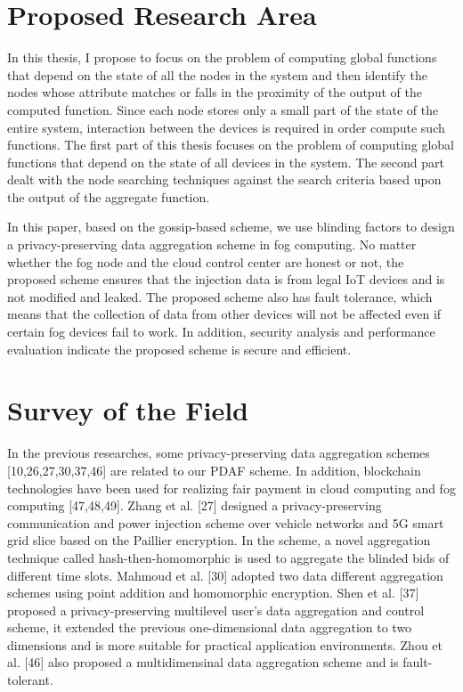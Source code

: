 \documentclass[10pt]{llncs}
\begin{document}
\section{Proposed Research Area}
%
In this thesis, I propose to focus on the problem of computing global functions that depend on the state of all the nodes in the system and then identify the nodes whose attribute matches or falls in the proximity of the output of the computed function. Since each node stores only a small part of the state of the entire system, interaction between the devices is required in order compute such functions. The first part of this thesis focuses on the problem of computing global functions that depend on the state of all devices in the system. The second part dealt with the node searching techniques against the search criteria based upon the output of the aggregate function.


In this paper, based on the gossip-based scheme, we use blinding factors to design a privacy-preserving data aggregation scheme in fog computing. No matter whether the fog node and the cloud control center are honest or not, the proposed scheme ensures that the injection data is from legal IoT devices and is not modified and leaked. The proposed scheme also has fault tolerance, which means that the collection of data from other devices will not be affected even if certain fog devices fail to work. In addition, security analysis and performance evaluation indicate the proposed scheme is secure and efficient.

%
\section{Survey of the Field}
 In the previous researches, some privacy-preserving data aggregation schemes [10,26,27,30,37,46] are related to our PDAF scheme. In addition, blockchain technologies have been used for realizing fair payment in cloud computing and fog computing [47,48,49]. Zhang et al. [27] designed a privacy-preserving communication and power injection scheme over vehicle networks and 5G smart grid slice based on the Paillier encryption. In the scheme, a novel aggregation technique called hash-then-homomorphic is used to aggregate the blinded bids of different time slots. Mahmoud et al. [30] adopted two data different aggregation schemes using point addition and homomorphic encryption. Shen et al. [37] proposed a privacy-preserving multilevel user’s data aggregation and control scheme, it extended the previous one-dimensional data aggregation to two dimensions and is more suitable for practical application environments. Zhou et al. [46] also proposed a multidimensinal data aggregation scheme and is fault-tolerant.
\end{document}
